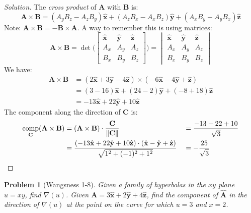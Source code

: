 \documentclass[oneside]{book}
\theoremstyle{mystyle}
\newtheorem{problem}{Problem}[section]
\DeclareMathOperator{\comp}{comp}
\DeclarePairedDelimiter\norm{\lVert}{\rVert}
\begin{document}
\begin{proof}[Solution]
The \textit{cross product} of $\mathbf{A}$ with $\mathbf{B}$ is:
\begin{equation*}
    \mathbf{A}\times\mathbf{B}=(A_{y}B_{z}-A_{z}B_{y})\hat{\mathbf{x}}+(A_{z}B_{x}-A_{x}B_{z})\hat{\mathbf{y}}+(A_{x}B_{y}-A_{y}B_{x})\hat{\mathbf{z}}
\end{equation*}
Note: $\mathbf{A}\times\mathbf{B} = -\mathbf{B}\times\mathbf{A}$. A way to remember this is using matrices:
\begin{equation*}
    \mathbf{A}\times\mathbf{B}=\det\Bigg(\begin{bmatrix}\hat{\mathbf{x}}&\hat{\mathbf{y}}&\hat{\mathbf{z}}\\A_{x}&A_{y}&A_{z}\\B_{x}&B_{y}&B_{z}\end{bmatrix}\Bigg)=\begin{vmatrix}\hat{\mathbf{x}}&\hat{\mathbf{y}}&\hat{\mathbf{z}}\\A_{x}&A_{y}&A_{z}\\B_{x}&B_{y}&B_{z}\end{vmatrix}
\end{equation*}
We have:
\begin{align*}
    \mathbf{A}\times\mathbf{B} &=(2\hat{\mathbf{x}}+3\hat{\mathbf{y}}-4\hat{\mathbf{z}})\times(-6\hat{\mathbf{x}}-4\hat{\mathbf{y}}+\hat{\mathbf{z}})\\
    &= (3-16)\hat{\mathbf{x}}+(24-2)\hat{\mathbf{y}}+(-8+18)\hat{\mathbf{z}}\\
    &= -13\hat{\mathbf{x}}+22\hat{\mathbf{y}}+10\hat{\mathbf{z}}
\end{align*}
The component along the direction of $\mathbf{C}$ is:
\begin{align*}
    \comp_{\mathbf{C}}(\mathbf{A}\times\mathbf{B})&=(\mathbf{A}\times\mathbf{B})\cdot\frac{\mathbf{C}}{\norm{\mathbf{C}}}& &=\frac{-13-22+10}{\sqrt{3}}\\
    &=\frac{(-13\hat{\mathbf{x}}+22\hat{\mathbf{y}}+10\hat{\mathbf{z}})\cdot(\hat{\mathbf{x}}-\hat{\mathbf{y}}+\hat{\mathbf{z}})}{\sqrt{1^2+(-1)^2+1^2}}& &=-\frac{25}{\sqrt{3}}
\end{align*}
\end{proof}
\begin{problem}[Wangsness 1-8]
Given a family of hyperbolas in the $xy$ plane $u=xy$, find $\nabla(u)$. Given $\mathbf{A}=3\hat{\mathbf{x}}+2\hat{\mathbf{y}}+4\hat{\mathbf{z}}$, find the component of $\hat{\mathbf{A}}$ in the direction of $\nabla(u)$ at the point on the curve for which $u=3$ and $x=2$.
\end{problem}
\end{document}
